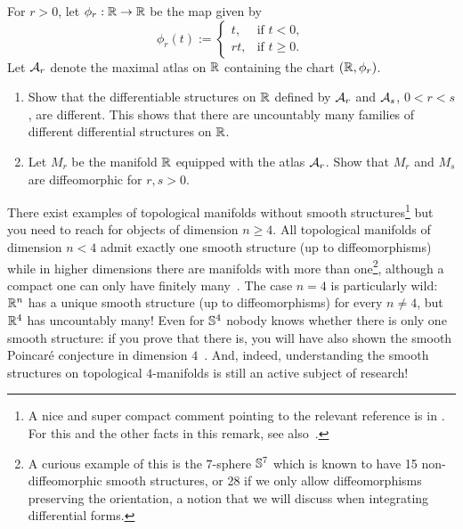 \begin{exercise}
	For $r>0$, let $\phi_r:\mathbb{R}\to\mathbb{R}$ be the map given by
	\begin{equation}
		\phi_r(t) := \begin{cases}
			t,  & \mbox{if } t<0,    \\
			rt, & \mbox{if } t\geq0.
		\end{cases}
	\end{equation}
	Let $\mathcal{A}_r$ denote the maximal atlas on $\mathbb{R}$ containing the chart $(\mathbb{R}, \phi_r)$.
	\begin{enumerate}
		\item Show that the differentiable structures on $\mathbb{R}$ defined by $\mathcal{A}_r$ and $\mathcal{A}_s$, $0<r<s$, are different.
		      This shows that there are uncountably many families of different differential structures on $\mathbb{R}$.
		\item Let $M_r$ be the manifold $\mathbb{R}$ equipped with the atlas $\mathcal{A}_r$.
		      Show that $M_r$ and $M_s$ are diffeomorphic for $r,s >0$.
	\end{enumerate}
\end{exercise}

\begin{remark}\label{remark:smoothstr}
	There exist examples of topological manifolds without smooth structures\footnote{A nice and super compact comment pointing to the relevant reference is in \cite{SE2691140}. For this and the other facts in this remark, see also~\cite[pp.~13 and 39--40]{book:lee}.} but you need to reach for objects of dimension $n \geq 4$.
	All topological manifolds of dimension $n < 4$ admit exactly one smooth structure (up to diffeomorphisms) while in higher dimensions there are manifolds with more than one\footnote{A curious example of this is the $7$-sphere $\mathbb{S}^7$ which is known to have 15 non-diffeomorphic smooth structures, or 28 if we only allow diffeomorphisms preserving the orientation, a notion that we will discuss when integrating differential forms.}, although a compact one can only have finitely many~\cite[Essay~IV, \S10]{book:kirbysiebenmann}.
	The case $n = 4$ is particularly wild: $\mathbb{R}^n$ has a unique smooth structure (up to diffeomorphisms) for every $n\neq 4$, but $\mathbb{R}^4$ has uncountably many! Even for $\mathbb{S}^4$ nobody knows whether there is only one smooth structure: if you prove that there is, you will have also shown the smooth Poincar\'e conjecture in dimension $4$~\cite{notes:calegari, article:quanta:topology}. And, indeed, understanding the smooth structures on topological $4$-manifolds is still an active subject of research!
\end{remark}

